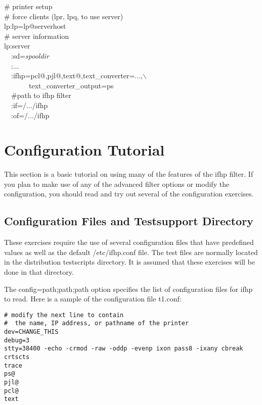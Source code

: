 \documentclass[a4paper]{article}
\begin{document}
\begin{tscreen}
\# printer setup  \\ 
\#  force clients (lpr, lpq, to use server)  \\ 
lp:lp=lp@serverhost  \\ 
\# server information  \\ 
lp:server  \\ 
~~:sd={\itshape spooldir\/}  \\ 
~~:...  \\ 
~~:ifhp=pcl@,pjl@,text@,text\_converter=...,$\backslash$ \\ 
~~~~~~~text\_converter\_output=ps~\\ 
~~\#path to ifhp filter  \\ 
~~:if=/.../ifhp  \\ 
~~:of=/.../ifhp  
\end{tscreen}





\section{Configuration Tutorial}

This section is a basic tutorial on using many of the features of
the
{\ttfamily ifhp}
filter.
If you plan to make use of any of the advanced filter options or
modify the configuration,
you should read and try out several of the
configuration exercises.


\subsection{Configuration Files and Testsupport Directory }

These exercises require the use of several configuration files
that have predefined values as well as the
default
{\ttfamily /etc/ifhp.conf} file.
The test files are normally located in the distribution 
{\ttfamily testscripts}
directory.
It is assumed that these exercises will be done in that
directory.

The
{\ttfamily config=path;path;path}
option specifies the list of configuration files for
{\ttfamily ifhp}
to read.
Here is a sample of the configuration file
{\ttfamily t1.conf}:
\begin{tscreen}
\begin{verbatim}
# modify the next line to contain
#  the name, IP address, or pathname of the printer
dev=CHANGE_THIS
debug=3
stty=38400 -echo -crmod -raw -oddp -evenp ixon pass8 -ixany cbreak crtscts
trace
ps@ 
pjl@
pcl@
text
\end{verbatim}
\end{tscreen}
\end{document}
